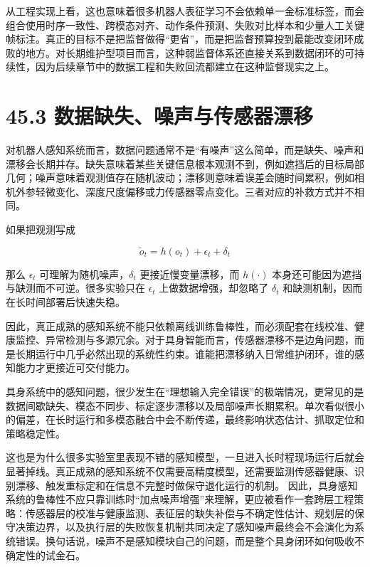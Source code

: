 从工程实现上看，这也意味着很多机器人表征学习不会依赖单一金标准标签，而会组合使用时序一致性、跨模态对齐、动作条件预测、失败对比样本和少量人工关键帧标注。真正的目标不是把监督做得“更省”，而是把监督预算投到最能改变闭环成败的地方。对长期维护型项目而言，这种弱监督体系还直接关系到数据闭环的可持续性，因为后续章节中的数据工程和失败回流都建立在这种监督现实之上。

\section*{45.3 数据缺失、噪声与传感器漂移}


对机器人感知系统而言，数据问题通常不是“有噪声”这么简单，而是缺失、噪声和漂移会长期并存。缺失意味着某些关键信息根本观测不到，例如遮挡后的目标局部几何；噪声意味着观测值存在随机波动；漂移则意味着误差会随时间累积，例如相机外参轻微变化、深度尺度偏移或力传感器零点变化。三者对应的补救方式并不相同。

如果把观测写成

\begin{equation*}
\tilde{o}_t = h(o_t) + \epsilon_t + \delta_t
\end{equation*}

那么 \(\epsilon_t\) 可理解为随机噪声，\(\delta_t\) 更接近慢变量漂移，而 \(h(\cdot)\) 本身还可能因为遮挡与缺测而不可逆。很多实验只在 \(\epsilon_t\) 上做数据增强，却忽略了 \(\delta_t\) 和缺测机制，因而在长时间部署后快速失稳。

因此，真正成熟的感知系统不能只依赖离线训练鲁棒性，而必须配套在线校准、健康监控、异常检测与多源冗余。对于具身智能而言，传感器漂移不是边角问题，而是长期运行中几乎必然出现的系统性约束。谁能把漂移纳入日常维护闭环，谁的感知能力才更接近可交付能力。

具身系统中的感知问题，很少发生在“理想输入完全错误”的极端情况，更常见的是数据间歇缺失、模态不同步、标定逐步漂移以及局部噪声长期累积。单次看似很小的偏差，在长时运行和多模态融合中会不断传递，最终影响状态估计、抓取定位和策略稳定性。

这也是为什么很多实验室里表现不错的感知模型，一旦进入长时程现场运行后就会显著掉线。真正成熟的感知系统不仅需要高精度模型，还需要监测传感器健康、识别漂移、触发重标定和在信息不完整时做保守退化运行的机制。 因此，具身感知系统的鲁棒性不应只靠训练时“加点噪声增强”来理解，更应被看作一套跨层工程策略：传感器层的校准与健康监测、表征层的缺失补偿与不确定性估计、规划层的保守决策边界，以及执行层的失败恢复机制共同决定了感知噪声最终会不会演化为系统错误。换句话说，噪声不是感知模块自己的问题，而是整个具身闭环如何吸收不确定性的试金石。

